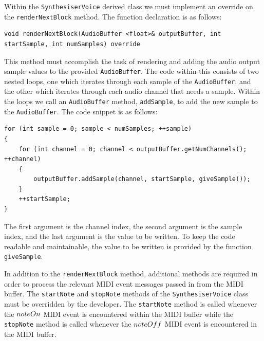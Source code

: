 \documentclass[a4paper,12pt]{report}
\begin{document}
Within the \texttt{Synthesiser\-Voice} derived class we must implement an override on the \texttt{render\-Next\-Block} method. The function declaration is as follows:

 \noindent\begin{minipage}{\linewidth} \begin{lstlisting}[caption={\texttt{renderNextBlock()} override},label={code:rendernextblockoverride},captionpos=b]
void renderNextBlock(AudioBuffer <float>& outputBuffer, int startSample, int numSamples) override
\end{lstlisting} \end{minipage}

This method must accomplish the task of rendering and adding the audio output sample values to the provided \texttt{Audio\-Buffer}. The code within this consists of two nested loops, one which iterates through each sample of the \texttt{Audio\-Buffer}, and the other which iterates through each audio channel that needs a sample. Within the loops we call an \texttt{Audio\-Buffer} method, \texttt{add\-Sample}, to add the new sample to the \texttt{Audio\-Buffer}. The code snippet is as follows:

 \noindent\begin{minipage}{\linewidth} \begin{lstlisting}[caption={\texttt{addSample()}},label={code:addsample},captionpos=b]
for (int sample = 0; sample < numSamples; ++sample)
{
    for (int channel = 0; channel < outputBuffer.getNumChannels(); ++channel)
    {
        outputBuffer.addSample(channel, startSample, giveSample());
    }
    ++startSample;
}
\end{lstlisting} \end{minipage}

The first argument is the channel index, the second argument is the sample index, and the last argument is the value to be written. To keep the code readable and maintainable, the value to be written is provided by the function \texttt{give\-Sample}. 

In addition to the \texttt{render\-Next\-Block} method, additional methods are required in order to process the relevant MIDI event messages passed in from the MIDI buffer. The \texttt{start\-Note} and \texttt{stop\-Note} methods of the \texttt{Synthesiser\-Voice} class must be overridden by the developer. The \texttt{start\-Note} method is called whenever the $note\-On$ MIDI event is encountered within the MIDI buffer while the \texttt{stop\-Note} method is called whenever the $note\-Off$ MIDI event is encountered in the MIDI buffer.	
\end{document}
